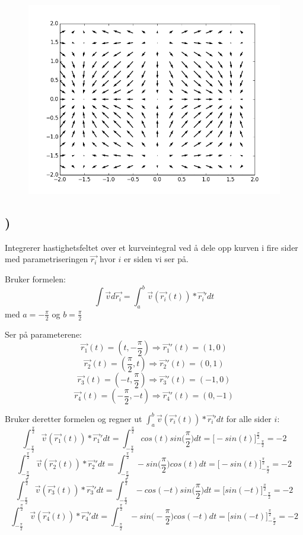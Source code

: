 \documentclass[a4paper,10pt,norsk]{article}
\begin{document}
\begin{figure}[h!]
        \centering 
        \includegraphics[scale=0.7]{oppg3.png}
\end{figure}





\subsection{)}
Integrerer hastighetsfeltet over et kurveintegral ved å dele opp kurven i fire sider med parametriseringen $\vec{r_{i}}$ hvor $i$ er siden vi ser på.

Bruker formelen: 
\[\int \vec{v}d\vec{r_{i}} = \int_{a}^{b}\vec{v}(\vec{r_{i}}(t)) * \vec{r_{i}}'dt\]
med $a = -\frac{\pi}{2}$ og $b = \frac{\pi}{2}$

Ser på parameterene:
\[\vec{r_{1}}(t) = (t, -\frac{\pi}{2}) \Rightarrow \vec{r_{1}}'(t) = (1, 0)\]
\[\vec{r_{2}}(t) = (\frac{\pi}{2}, t) \Rightarrow \vec{r_{2}}'(t) = (0, 1)\]
\[\vec{r_{3}}(t) = (-t, \frac{\pi}{2}) \Rightarrow \vec{r_{3}}'(t) = (-1, 0)\]
\[\vec{r_{4}}(t) = (-\frac{\pi}{2}, -t) \Rightarrow \vec{r_{4}}'(t) = (0, -1)\]

Bruker deretter formelen og regner ut $\int_{a}^{b} \vec{v}(\vec{r_{i}}(t)) * \vec{r_{i}}'dt$ for alle sider $i$:
\[\int_{-\frac{\pi}{2}}^{\frac{\pi}{2}}\vec{v}(\vec{r_{1}}(t)) * \vec{r_{1}}'dt = \int_{-\frac{\pi}{2}}^{\frac{\pi}{2}}cos(t)sin\Big(\frac{\pi}{2}\Big) dt = \Big[-sin(t)\Big]_{-\frac{\pi}{2}}^{\frac{\pi}{2}} = -2\]
\[\int_{-\frac{\pi}{2}}^{\frac{\pi}{2}}\vec{v}(\vec{r_{2}}(t)) * \vec{r_{2}}'dt = \int_{-\frac{\pi}{2}}^{\frac{\pi}{2}}-sin\Big(\frac{\pi}{2}\Big) cos(t) dt = \Big[-sin(t)\Big]_{-\frac{\pi}{2}}^{\frac{\pi}{2}} = -2\]
\[\int_{-\frac{\pi}{2}}^{\frac{\pi}{2}}\vec{v}(\vec{r_{3}}(t)) * \vec{r_{3}}'dt = \int_{-\frac{\pi}{2}}^{\frac{\pi}{2}}-cos(-t)sin\Big(\frac{\pi}{2}\Big) dt = \Big[sin(-t)\Big]_{-\frac{\pi}{2}}^{\frac{\pi}{2}} = -2\]
\[\int_{-\frac{\pi}{2}}^{\frac{\pi}{2}}\vec{v}(\vec{r_{4}}(t)) * \vec{r_{4}}'dt = \int_{-\frac{\pi}{2}}^{\frac{\pi}{2}}-sin\Big(-\frac{\pi}{2}\Big) cos(-t) dt = \Big[sin(-t)\Big]_{-\frac{\pi}{2}}^{\frac{\pi}{2}} = -2\]
\end{document}

